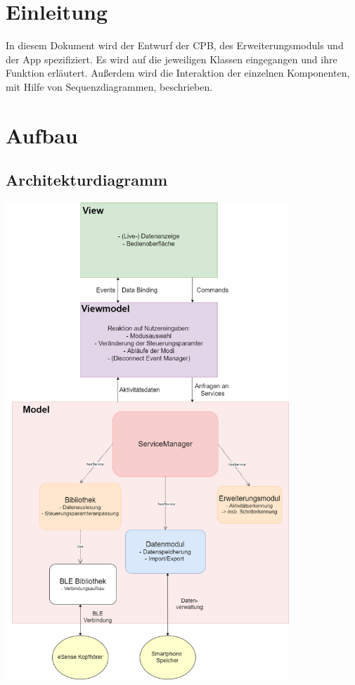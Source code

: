 \documentclass[a4paper,12pt]{article}
\title{\projektName}
\date{\today}
\author{Tec O'Brain}
\begin{document}
 \setcounter{page}{2}
 \tableofcontents          %
 \clearpage

\section{Einleitung}
In diesem Dokument wird der Entwurf der \Gls{CPB}, des Erweiterungsmoduls und der App spezifiziert. Es wird auf die jeweiligen Klassen eingegangen und ihre Funktion erläutert. Außerdem wird die Interaktion der einzelnen Komponenten, mit Hilfe von Sequenzdiagrammen, beschrieben.

\section{Aufbau}
	\subsection{Architekturdiagramm}
	\begin{center}
		\vspace{100px}
		\includegraphics[width=0.8\textwidth]{./Diagramme/ArchitekturdiagrammmitServiceManager.png}
	\end{center}
	\clearpage %
\end{document}
